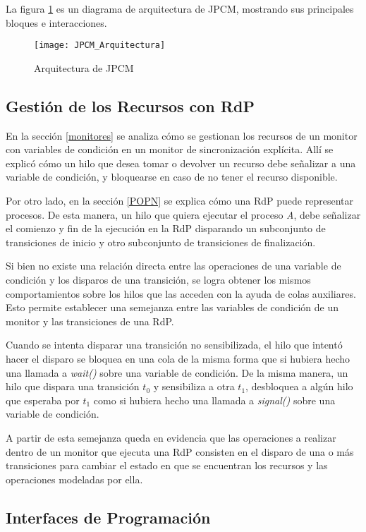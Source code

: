 La figura \ref{fig:JPCM_Arquitectura} es un diagrama de arquitectura de JPCM,
mostrando sus principales bloques e interacciones.

\begin{figure}[H]
  \centering
  \texttt{[image: JPCM\_Arquitectura]}
  \caption{Arquitectura de JPCM}
  \label{fig:JPCM_Arquitectura}
\end{figure}

\subsection{Gestión de los Recursos con RdP}
En la sección \ref{monitores} se analiza cómo se gestionan los recursos de un
monitor con variables de condición en un monitor de sincronización explícita.
Allí se explicó cómo un hilo que desea tomar o devolver un recurso debe
señalizar a una variable de condición, y bloquearse en caso de no tener el
recurso disponible.

Por otro lado, en la sección \ref{POPN} se explica cómo una RdP puede
representar procesos. De esta manera, un hilo que quiera ejecutar el proceso
\textit{A}, debe señalizar el comienzo y fin de la ejecución en la RdP
disparando un subconjunto de transiciones de inicio y otro subconjunto de
transiciones de finalización.
 
Si bien no existe una relación directa entre las operaciones de una variable de
condición y los disparos de una transición, se logra obtener los mismos
comportamientos sobre los hilos que las acceden con la ayuda de colas
auxiliares. Esto permite establecer una semejanza entre las variables de
condición de un monitor y las transiciones de una RdP.

Cuando se intenta disparar una transición no sensibilizada, el hilo que intentó
hacer el disparo se bloquea en una cola de la misma forma que si hubiera hecho
una llamada a \textit{wait()} sobre una variable de condición. De la misma
manera, un hilo que dispara una transición $t_{0}$ y sensibiliza a otra $t_{1}$,
desbloquea a algún hilo que esperaba por $t_{1}$ como si hubiera hecho una
llamada a \textit{signal()} sobre una variable de condición.

A partir de esta semejanza queda en evidencia que las operaciones a realizar
dentro de un monitor que ejecuta una RdP consisten en el disparo de una o más
transiciones para cambiar el estado en que se encuentran los recursos y las
operaciones modeladas por ella.

\subsection{Interfaces de Programación}

